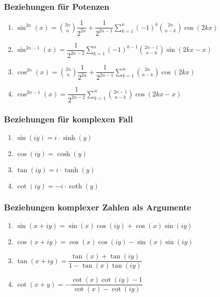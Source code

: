 \subsubsection{Beziehungen für Potenzen}
\begin{enumerate}[$(a)$] 
\item $\sin^{2n}\left(x\right)=\displaystyle \binom{2n}{n}\dfrac{1}{2^{2n}}+\dfrac{1}{2^{2n-1}}\displaystyle \sum_{k=1}^n\left(-1\right)^k\displaystyle \binom{2n}{n-k}\cos\left(2kx\right)$
\item $\sin^{2n-1}\left(x\right)=\dfrac{1}{2^{2n-2}}\displaystyle \sum_{k=1}^n\left(-1\right)^{k-1}\displaystyle \binom{2n-1}{n-k}\sin\left(2kx-x\right)$
\item $\cos^{2n}\left(x\right)=\displaystyle \binom{2n}{n}\dfrac{1}{2^{2n}}+\dfrac{1}{2^{2n-1}}\displaystyle \sum_{k=1}^n\displaystyle \binom{2n}{n-k}\cos\left(2kx\right)$
\item $\cos^{2n-1}\left(x\right)=\dfrac{1}{2^{2n-2}}\displaystyle \sum_{k=1}^n\displaystyle \binom{2n-1}{n-k}\cos\left(2kx-x\right)$
\end{enumerate}
\subsubsection{Beziehungen für komplexen Fall}
\begin{enumerate}[$(a)$]
\item $\sin\left(iy\right)=i\cdot \sinh\left(y\right)$
\item $\cos\left(iy\right)=\cosh\left(y\right)$
\item $\tan\left(iy\right)=i\cdot \tanh\left(y\right)$
\item $\cot\left(iy\right)=-i\cdot \coth\left(y\right)$
\end{enumerate}
\subsubsection{Beziehungen komplexer Zahlen als Argumente}
\begin{enumerate}[$(a)$] 
\item $\sin\left(x+iy\right)=\sin\left(x\right)\cos\left(iy\right)+ \cos\left(x\right)\sin\left(iy\right)$
\item $\cos\left(x+iy\right)=\cos\left(x\right)\cos\left(iy\right)- \sin\left(x\right)\sin\left(iy\right)$
\item $\tan\left(x+ iy\right)=\dfrac{\tan\left(x\right)+\tan\left(iy\right)}{1-\tan\left(x\right)\tan\left(iy\right)}$
\item $\cot\left(x+ y\right)=-\dfrac{\cot\left(x\right)\cot\left(iy\right)-1}{\cot\left(x\right)-\cot\left(iy\right)}$
\end{enumerate}
